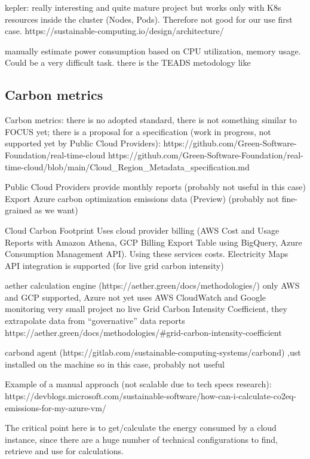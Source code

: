kepler: really interesting and quite mature project but works only with K8s resources inside the cluster (Nodes, Pods). Therefore not good for our use first case.
https://sustainable-computing.io/design/architecture/


manually estimate power consumption based on CPU utilization, memory usage. Could be a very difficult task. 
there is the TEADS metodology like 


\subsection{Carbon metrics}

Carbon metrics:
there is no adopted standard, there is not something similar to FOCUS yet;
there is a proposal for a specification (work in progress, not supported yet by Public Cloud Providers): 
https://github.com/Green-Software-Foundation/real-time-cloud 
https://github.com/Green-Software-Foundation/real-time-cloud/blob/main/Cloud_Region_Metadata_specification.md 


Public Cloud Providers provide monthly reports (probably not useful in this case)
Export Azure carbon optimization emissions data (Preview) (probably not fine-grained as we want)

Cloud Carbon Footprint
Uses cloud provider billing (AWS Cost and Usage Reports with Amazon Athena, GCP Billing Export Table using BigQuery, Azure Consumption 
Management API). Using these services costs.
Electricity Maps API integration is supported (for live grid carbon intensity)

 
aether calculation engine (https://aether.green/docs/methodologies/) 
only AWS and GCP supported, Azure not yet
uses AWS CloudWatch and Google monitoring
very small project
no live Grid Carbon Intensity Coefficient, they extrapolate data from “governative” data reports
https://aether.green/docs/methodologies/#grid-carbon-intensity-coefficient


carbond agent (https://gitlab.com/sustainable-computing-systems/carbond)
,ust installed on the machine
so in this case, probably not useful 


Example of a manual approach (not scalable due to tech specs research): https://devblogs.microsoft.com/sustainable-software/how-can-i-calculate-co2eq-emissions-for-my-azure-vm/ 

The critical point here is to get/calculate the energy consumed by a cloud instance, since there are a huge number of technical configurations to find, retrieve and use for calculations.



